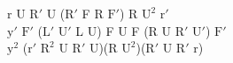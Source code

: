 r U $\text{R}'$ U ($\text{R}'$ F R $\text{F}'$) R $\text{U}^2$ $\text{r}'$\\
$\text{y}'$ $\text{F}'$ ($\text{L}'$ $\text{U}'$ L U) F U F (R U $\text{R}'$ $\text{U}'$) $\text{F}'$\\
$\text{y}^2$ ($\text{r}'$ $\text{R}^2$ U $\text{R}'$ U)(R $\text{U}^2$)($\text{R}'$ U $\text{R}'$ r)\\
